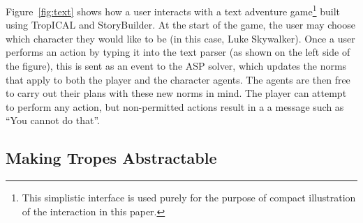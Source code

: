 Figure~\ref{fig:text} shows how a user interacts with a text adventure game\footnote{This simplistic interface is used purely for the purpose of compact illustration of the interaction in this paper.} built using TropICAL and StoryBuilder. At the start of the game, the user may choose which character they would like to be (in this case, Luke Skywalker). Once a user performs an action by typing it into the text parser (as shown on the left side of the figure), this is sent as an event to the ASP solver, which updates the norms that apply to both the player and the character agents. The agents are then free to carry out their plans with these new norms in mind. The player can attempt to perform any action, but non-permitted actions result in a a message such as ``You cannot do that''.


\subsection{Making Tropes Abstractable}

